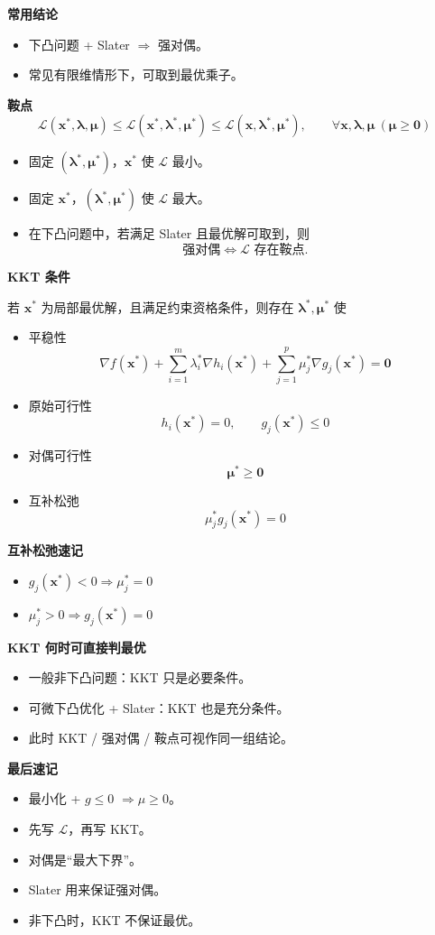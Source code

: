 \textbf{常用结论}
\begin{itemize}
	\item 下凸问题 + Slater $\Rightarrow$ 强对偶。
	\item 常见有限维情形下，可取到最优乘子。
\end{itemize}

\textbf{鞍点}
\[
\mathcal L(\mathbf{x}^*,\boldsymbol{\lambda},\boldsymbol{\mu})
\le \mathcal L(\mathbf{x}^*,\boldsymbol{\lambda}^*,\boldsymbol{\mu}^*)
\le \mathcal L(\mathbf{x},\boldsymbol{\lambda}^*,\boldsymbol{\mu}^*),
\qquad \forall \mathbf{x},\boldsymbol{\lambda},\boldsymbol{\mu}\ (\boldsymbol{\mu}\ge \mathbf{0})
\]
\begin{itemize}
	\item 固定 $(\boldsymbol{\lambda}^*,\boldsymbol{\mu}^*)$，$\mathbf{x}^*$ 使 $\mathcal L$ 最小。
	\item 固定 $\mathbf{x}^*$，$(\boldsymbol{\lambda}^*,\boldsymbol{\mu}^*)$ 使 $\mathcal L$ 最大。
	\item 在下凸问题中，若满足 Slater 且最优解可取到，则
	\[
	\text{强对偶} \iff \mathcal L \text{ 存在鞍点}.
	\]
\end{itemize}

\textbf{KKT 条件}

若 $\mathbf{x}^*$ 为局部最优解，且满足约束资格条件，则存在 $\boldsymbol{\lambda}^*,\boldsymbol{\mu}^*$ 使
\begin{itemize}
	\item 平稳性
	\[
	\nabla f(\mathbf{x}^*)+\sum_{i=1}^m \lambda_i^* \nabla h_i(\mathbf{x}^*)+\sum_{j=1}^p \mu_j^* \nabla g_j(\mathbf{x}^*)=\mathbf{0}
	\]
	\item 原始可行性
	\[
	h_i(\mathbf{x}^*)=0,\qquad g_j(\mathbf{x}^*)\le 0
	\]
	\item 对偶可行性
	\[
	\boldsymbol{\mu}^*\ge \mathbf{0}
	\]
	\item 互补松弛
	\[
	\mu_j^*g_j(\mathbf{x}^*)=0
	\]
\end{itemize}

\textbf{互补松弛速记}
\begin{itemize}
	\item $g_j(\mathbf{x}^*)<0 \Rightarrow \mu_j^*=0$
	\item $\mu_j^*>0 \Rightarrow g_j(\mathbf{x}^*)=0$
\end{itemize}

\textbf{KKT 何时可直接判最优}
\begin{itemize}
	\item 一般非下凸问题：KKT 只是必要条件。
	\item 可微下凸优化 + Slater：KKT 也是充分条件。
	\item 此时 KKT / 强对偶 / 鞍点可视作同一组结论。
\end{itemize}

\textbf{最后速记}
\begin{itemize}
	\item 最小化 + $g\le 0$ $\Rightarrow \mu\ge 0$。
	\item 先写 $\mathcal L$，再写 KKT。
	\item 对偶是“最大下界”。
	\item Slater 用来保证强对偶。
	\item 非下凸时，KKT 不保证最优。
\end{itemize}
